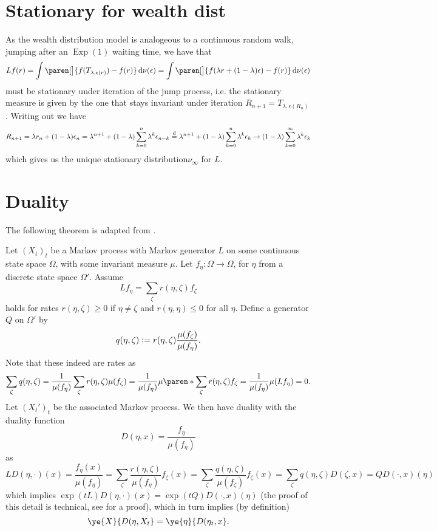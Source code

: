 \documentclass{article}
\begin{document}
\section{Stationary for wealth dist}

As the wealth distribution model is analogeous to a continuous random walk, jumping after an $\operatorname*{Exp}(1)$ waiting time, we have that
\[
Lf(r)
= \int \paren[\big]{f(T_{\lambda, \epsilon(r)}) - f(r) } \diff \nu(\epsilon)
= \int \paren[\big]{f(\lambda r + (1 - \lambda)\epsilon) - f(r) } \diff \nu(\epsilon)
\]
must be stationary under iteration of the jump process, i.e. the stationary measure is given by the one that stays invariant under iteration $R_{n+1} = T_{\lambda, \epsilon(R_n)}$. Writing out we have
\[
R_{n+1} = \lambda r_n + (1-\lambda)\epsilon_n
\\= \lambda^{n+1} + (1-\lambda)\sum_{k=0}^n \lambda^{k} \epsilon_{n-k}
\\\overset{\mathop{}\!\mathrm{d}}{=} \lambda^{n+1} + (1-\lambda)\sum_{k=0}^n \lambda^{k} \epsilon_{k}
\to 
 (1-\lambda)\sum_{k=0}^{\infty} \lambda^{k} \epsilon_{k}
\]
which gives us the unique stationary distribution$\nu_{\infty}$ for $L$.



\section{Duality}
The following theorem is adapted from \cite{barbour2000transition}.

Let $(X_t)_t$ be a Markov process with Markov generator $L$ on some continuous state space $\Omega$, with some invariant measure $\mu$. Let $f_{\eta} \colon \Omega \to \Omega$, for $\eta$ from a discrete state space $\Omega'$. Assume
\[
L f_{\eta} = \sum_{\zeta} r(\eta, \zeta) f_{\zeta}
\]
holds for rates $r(\eta, \zeta) \ge 0$ if $\eta \ne \zeta$ and $r(\eta, \eta) \le 0$ for all $\eta$.  Define a generator $Q$ on $\Omega'$ by
\[
q(\eta, \zeta) \vcentcolon= r(\eta, \zeta)\frac{\mu(f_{\zeta})}{\mu(f_{\eta})}.
\]
Note that these indeed are rates as
\[
\sum_{\zeta} q(\eta, \zeta) = \frac{1}{\mu(f_{\eta})} \sum_{\zeta} r(\eta, \zeta)\mu(f_{\zeta}) = \frac{1}{\mu(f_{\eta})} \mu\paren*{\sum_{\zeta} r(\eta, \zeta) f_{\zeta}} = \frac{1}{\mu(f_{\eta})} \mu(L f_{\eta}) = 0.
\]
Let $(X_t')_t$ be the associated Markov process. We then have duality with the duality function
\[
D(\eta, x) = \frac{f_{\eta}}{\mu(f_{\eta})}
\]
as
\[
LD(\eta, \cdot)(x)
= \frac{f_{\eta}(x)}{\mu(f_{\eta})}
= \sum_{\zeta} \frac{r(\eta, \zeta)}{\mu(f_{\eta})} f_{\zeta}(x)
= \sum_{\zeta} \frac{q(\eta, \zeta)}{\mu(f_{\zeta})} f_{\zeta}(x)
= \sum_{\zeta} q(\eta, \zeta) D(\zeta, x)
= Q D(\cdot, x)(\eta)
\]
which implies
$\exp(tL) D(\eta, \cdot)(x) = \exp(tQ) D(\cdot, x)(\eta)$
(the proof of this detail is technical, see \cite{voss2011equivalence} for a proof), which in turn implies (by definition) %
\[
\ye{X}{D(\eta, X_t}
= \ye{\eta}{D(\eta_t, x}.
\]
\end{document}
